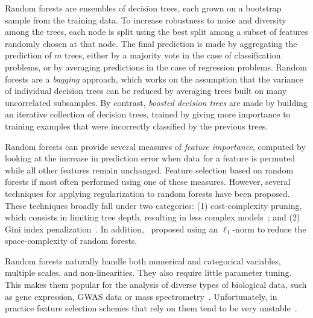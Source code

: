     Random forests are ensembles of decision trees, each grown on a bootstrap sample from the training data.
    To increase robustness to noise and diversity among the trees, each node is split using the best split among a subset of features randomly chosen at that node.
    The final prediction is made by aggregating the prediction of $m$ trees, either by a majority vote in the case of classification problems, or by averaging predictions in the case of regression problems.
    Random forests are a {\it bagging} approach, which works on the assumption that the variance of individual decision trees can be reduced by averaging trees built on many uncorrelated subsamples.
    By contrast, {\it boosted decision trees} are made by building an iterative collection of decision trees, trained by giving more importance to training examples that were incorrectly classified by the previous trees. 

    Random forests can provide several measures of {\it feature importance}, computed by looking at the increase in prediction error %
    when data for a feature is permuted while all other features remain unchanged. Feature selection based on random forests if most often performed using one of these measures. However, several techniques for applying regularization to random forests have been proposed. These techniques broadly fall under two categories: (1) cost-complexity pruning, which consists in limiting tree depth, resulting in less complex models~\cite{ishwaran2008random,kulkarni2012pruning}; and (2) Gini index penalization~\cite{deng2013gene, liu2014learning}. In addition,~\cite{joly2012ell1} proposed using an $\ell_1$-norm  to reduce the space-complexity of random forests.

    Random forests naturally handle both numerical and categorical variables, multiple scales, and non-linearities. They also require little parameter tuning. This makes them popular for the analysis of diverse types of biological data, such as gene expression, GWAS data or mass spectrometry~\cite{qi2012random}. Unfortunately, in practice feature selection schemes that rely on them tend to be very unstable~\cite{kursa2014robustness}.

